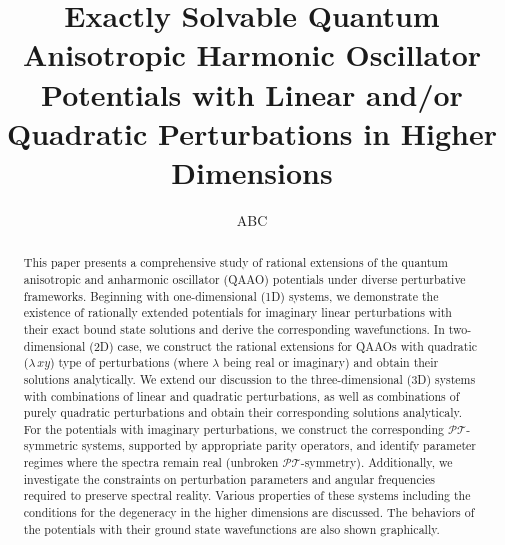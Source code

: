 \documentclass[a4paper, 12pt]{article}
\title{Exactly Solvable Quantum Anisotropic Harmonic Oscillator Potentials with Linear and/or Quadratic Perturbations in Higher Dimensions}
\author{ABC}
\date{}
\begin{document}
\maketitle






\begin{abstract}
    This paper presents a comprehensive study of rational extensions of the quantum anisotropic and anharmonic oscillator (QAAO) potentials under diverse perturbative frameworks. Beginning with one-dimensional (1D) systems, we demonstrate the existence of rationally extended potentials for imaginary linear perturbations with their exact bound state solutions and derive the corresponding wavefunctions. In two-dimensional (2D) case, we construct the rational extensions for QAAOs with quadratic ($\lambda \, xy$) type of perturbations (where $\lambda$ being real or imaginary) and obtain their solutions analytically. We extend our discussion to the three-dimensional (3D) systems with combinations of linear and quadratic perturbations, as well as combinations of purely quadratic perturbations and obtain their corresponding solutions analyticaly.
    For the potentials with imaginary perturbations, we construct the corresponding $\mathcal{PT}$-symmetric systems, supported by appropriate parity operators, and identify parameter regimes where the spectra remain real (unbroken $\mathcal{PT}$-symmetry). Additionally, we investigate the constraints on perturbation parameters and angular frequencies required to preserve spectral reality. Various properties of these systems including the conditions for the degeneracy in the higher dimensions are discussed. The behaviors of the potentials with their ground state wavefunctions are also shown graphically.
\end{abstract}

\end{document}
